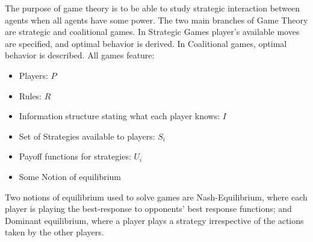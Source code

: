 \documentclass[12pt]{paper}
\begin{document}
The purpose of game theory is to be able to study strategic interaction between
agents when all agents have some power. The two main branches of Game Theory are
strategic and coalitional games. In Strategic Games player's available moves are
specified, and optimal behavior is derived. In Coalitional games, optimal
behavior is described. All games feature:
\begin{itemize}
\item Players: $P$
\item Rules: $R$
\item Information structure stating what each player knows: $I$
\item Set of Strategies available to players: $S_i$
\item Payoff functions for strategies: $U_i$
\item Some Notion of equilibrium
\end{itemize}

Two notions of equilibrium used to solve games are Nash-Equilibrium, where each
player is playing the best-response to opponents' best response functions; and
Dominant equilibrium, where a player plays a strategy irrespective of the
actions taken by the other players.
\end{document}
